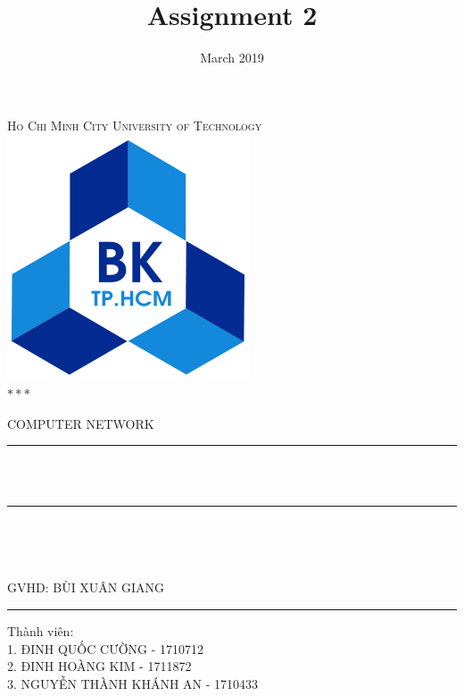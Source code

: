 \documentclass[12pt]{report}
\title{Assignment 2}
\author{}
\date{March 2019}
\makeatletter
\let\thetitle\@title
\makeatother
\begin{document}

\begin{titlepage}
	\centering
    \vspace*{0.5 cm}
\begin{center}
    \textsc{\Large   Ho Chi Minh City University of Technology
	}\\[0.3 cm]
	\includegraphics[scale=0.4]{hcmut.png} \\
	$\ast\ast\ast$
	\\[3.0cm]
\end{center}%
	\textsc{\LARGE COMPUTER NETWORK}\\[0.5 cm]				%
	\rule{\linewidth}{0.2 mm} \\[0.4 cm]
	{ \huge \bfseries \thetitle}\\
	\rule{\linewidth}{0.2 mm} \\[1.5 cm]
	
	\begin{minipage}{0.0\textwidth}
		\begin{flushleft} \large
			\end{flushleft}
			\end{minipage}~
			\begin{minipage}{0.5\textwidth}
            
			\begin{flushleft} \large
			GVHD: BÙI XUÂN GIANG \\
			\rule{\linewidth}{0.2 mm}
			Thành viên: \\
			1. ĐINH QUỐC CƯỜNG - 1710712\\
			2. ĐINH HOÀNG KIM - 1711872\\
			3. NGUYỄN THÀNH KHÁNH AN - 1710433
		\end{flushleft}
           
	\end{minipage}\\[2 cm]
	 
    
    
	
\end{titlepage}
\end{document}
